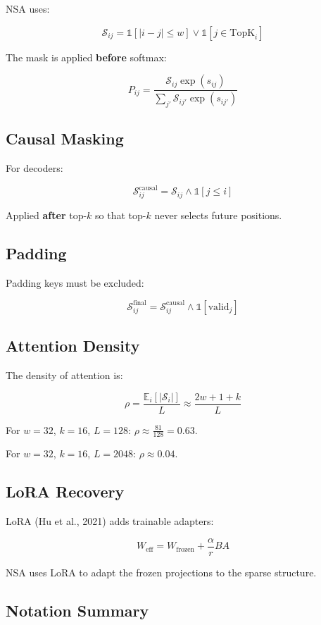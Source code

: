 NSA uses:

\[
\mathcal{S}_{ij} = \mathbb{1}[|i - j| \leq w] \lor \mathbb{1}[j \in \text{TopK}_i]
\tag{3.4}
\]

The mask is applied \textbf{before} softmax:

\[
P_{ij} = \frac{\mathcal{S}_{ij} \exp(s_{ij})}{\sum_{j'} \mathcal{S}_{ij'} \exp(s_{ij'})}
\tag{3.5}
\]

\subsection{Causal Masking}

For decoders:

\[
\mathcal{S}_{ij}^\text{causal} = \mathcal{S}_{ij} \land \mathbb{1}[j \leq i]
\tag{3.6}
\]

Applied \textbf{after} top-$k$ so that top-$k$ never selects future positions.

\subsection{Padding}

Padding keys must be excluded:

\[
\mathcal{S}_{ij}^\text{final} = \mathcal{S}_{ij}^\text{causal} \land \mathbb{1}[\text{valid}_j]
\tag{3.7}
\]

\subsection{Attention Density}

The density of attention is:

\[
\rho = \frac{\mathbb{E}_i[|\mathcal{S}_i|]}{L} \approx \frac{2w + 1 + k}{L}
\tag{3.8}
\]

For $w = 32$, $k = 16$, $L = 128$: $\rho \approx \frac{81}{128} = 0.63$.

For $w = 32$, $k = 16$, $L = 2048$: $\rho \approx 0.04$.

\subsection{LoRA Recovery}

LoRA (Hu et al., 2021) adds trainable adapters:

\[
W_\text{eff} = W_\text{frozen} + \frac{\alpha}{r} B A
\tag{3.9}
\]

NSA uses LoRA to adapt the frozen projections to the sparse structure.

\subsection{Notation Summary}

